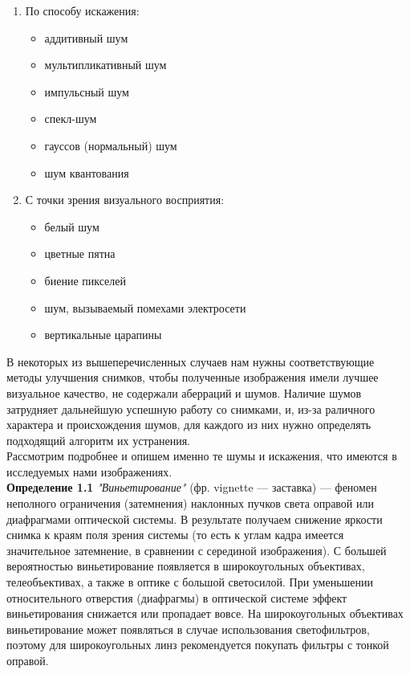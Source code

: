 \documentclass[12pt]{article}
\begin{document}
\begin{enumerate}
	\item По способу искажения:\\
	\begin{itemize}
		\item аддитивный шум
		\item мультипликативный шум
		\item импульсный шум
		\item спекл-шум
		\item гауссов (нормальный) шум
		\item шум квантования
	\end{itemize}
	\item С точки зрения визуального восприятия:\\
	\begin{itemize}
		\item белый шум 
		\item цветные пятна
		\item биение пикселей
		\item шум, вызываемый помехами электросети
		\item вертикальные царапины
	\end{itemize}
\end{enumerate}

В некоторых из вышеперечисленных случаев нам нужны соответствующие методы улучшения снимков, чтобы полученные изображения имели лучшее визуальное качество, не содержали аберраций и шумов. Наличие шумов затрудняет дальнейшую успешную работу со снимками, и, из-за раличного характера и происхождения шумов, для каждого из них нужно определять подходящий алгоритм их устранения.\\

Рассмотрим подробнее и опишем именно те шумы и искажения, что имеются в исследуемых нами изображениях.\\ 
\textbf{Определение 1.1} \textit{"Виньетирование"} (фр. vignette — заставка) — феномен неполного ограничения (затемнения) наклонных пучков света оправой или диафрагмами оптической системы. В результате получаем снижение яркости снимка к краям поля зрения системы (то есть к углам кадра имеется значительное затемнение, в сравнении с серединой изображения). С большей вероятностью виньетирование появляется в широкоугольных объективах, телеобъективах, а также в оптике с большой светосилой. При уменьшении относительного отверстия (диафрагмы) в оптической системе эффект виньетирования снижается или пропадает вовсе. На широкоугольных объективах виньетирование может появляться в случае использования светофильтров, поэтому для широкоугольных линз рекомендуется покупать фильтры с тонкой оправой.\\
\end{document}
